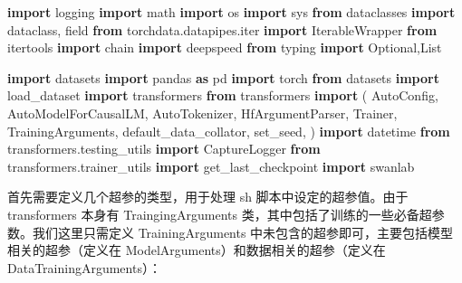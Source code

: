 \documentclass[
]{article}
\newenvironment{Shaded}{}{}
\newcommand{\BuiltInTok}[1]{\textcolor[rgb]{0.00,0.50,0.00}{#1}}
\newcommand{\ImportTok}[1]{\textcolor[rgb]{0.00,0.50,0.00}{\textbf{#1}}}
\newcommand{\NormalTok}[1]{#1}
\begin{document}
\begin{Shaded}
\begin{Highlighting}[]
\ImportTok{import}\NormalTok{ logging}
\ImportTok{import}\NormalTok{ math}
\ImportTok{import}\NormalTok{ os}
\ImportTok{import}\NormalTok{ sys}
\ImportTok{from}\NormalTok{ dataclasses }\ImportTok{import}\NormalTok{ dataclass, field}
\ImportTok{from}\NormalTok{ torchdata.datapipes.}\BuiltInTok{iter} \ImportTok{import}\NormalTok{ IterableWrapper}
\ImportTok{from}\NormalTok{ itertools }\ImportTok{import}\NormalTok{ chain}
\ImportTok{import}\NormalTok{ deepspeed}
\ImportTok{from}\NormalTok{ typing }\ImportTok{import}\NormalTok{ Optional,List}

\ImportTok{import}\NormalTok{ datasets}
\ImportTok{import}\NormalTok{ pandas }\ImportTok{as}\NormalTok{ pd}
\ImportTok{import}\NormalTok{ torch}
\ImportTok{from}\NormalTok{ datasets }\ImportTok{import}\NormalTok{ load\_dataset}
\ImportTok{import}\NormalTok{ transformers}
\ImportTok{from}\NormalTok{ transformers }\ImportTok{import}\NormalTok{ (}
\NormalTok{    AutoConfig,}
\NormalTok{    AutoModelForCausalLM,}
\NormalTok{    AutoTokenizer,}
\NormalTok{    HfArgumentParser,}
\NormalTok{    Trainer,}
\NormalTok{    TrainingArguments,}
\NormalTok{    default\_data\_collator,}
\NormalTok{    set\_seed,}
\NormalTok{)}
\ImportTok{import}\NormalTok{ datetime}
\ImportTok{from}\NormalTok{ transformers.testing\_utils }\ImportTok{import}\NormalTok{ CaptureLogger}
\ImportTok{from}\NormalTok{ transformers.trainer\_utils }\ImportTok{import}\NormalTok{ get\_last\_checkpoint}
\ImportTok{import}\NormalTok{ swanlab}
\end{Highlighting}
\end{Shaded}

首先需要定义几个超参的类型，用于处理 sh 脚本中设定的超参值。由于
transformers 本身有 TraingingArguments
类，其中包括了训练的一些必备超参数。我们这里只需定义 TrainingArguments
中未包含的超参即可，主要包括模型相关的超参（定义在
ModelArguments）和数据相关的超参（定义在 DataTrainingArguments）：
\end{document}
